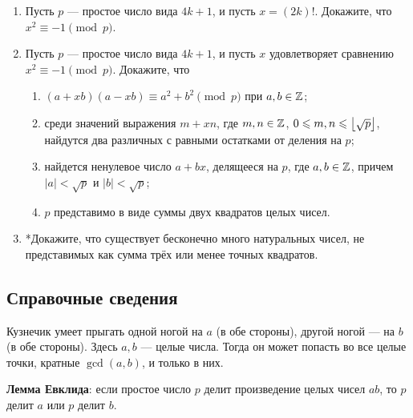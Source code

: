 \begin{enumerate}
\item Пусть $p$ --- простое число вида $4k+1$, и пусть $x=(2k)!$. Докажите, что $x^2\equiv -1\pmod p$.
\item Пусть $p$ --- простое число вида $4k+1$, и пусть $x$ удовлетворяет сравнению $x^2\equiv -1\pmod p$. Докажите, что
\begin{enumerate}
\item $(a+xb)(a-xb) \equiv a^2+b^2 \pmod p$ при $a,b\in\mathbb Z$;
\item среди значений выражения $m+xn$, где $m,n\in\mathbb Z$, $0\leqslant m,n\leqslant\left\lfloor\sqrt p\right\rfloor$, найдутся два различных с равными остатками от деления на $p$;
\item найдется ненулевое число $a+bx$, делящееся на $p$, где $a,b\in\mathbb Z$, причем $|a|<\sqrt p$ и $|b|<\sqrt p$;
\item $p$ представимо в виде суммы двух квадратов целых чисел.
\end{enumerate}

\item *Докажите, что существует бесконечно много натуральных чисел, не представимых как сумма трёх или менее точных квадратов.

\end{enumerate}

\subsection*{Справочные сведения}

Кузнечик умеет прыгать одной ногой на $a$ (в обе стороны), другой ногой --- на $b$ (в обе стороны). Здесь $a,b$ --- целые числа. Тогда он может попасть во все целые точки, кратные $\gcd(a,b)$, и только в них.

\textbf{Лемма Евклида}: если простое число $p$ делит произведение целых чисел $ab$, то $p$ делит $a$ или $p$ делит $b$.

